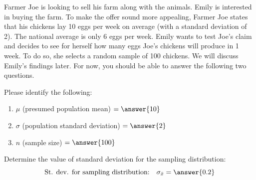 \documentclass{ximera}
\begin{document}
\begin{problem}\label{pr:farmerJoe}
Farmer Joe is looking to sell his farm along with the animals. Emily is interested in buying the farm. To make the offer sound more appealing, Farmer Joe states that his chickens lay 10 eggs per week on average (with a standard deviation of 2).  The national average is only 6 eggs per week. Emily wants to test Joe's claim and decides to see for herself how many eggs Joe's chickens will produce in 1 week. To do so, she selects a random sample of 100 chickens. We will discuss Emily's findings later.  For now, you should be able to answer the following two questions.

\begin{question}
Please identify the following:
 \begin{enumerate}
     \item $\mu$ (presumed population mean) $= \answer{10}$
     \item $\sigma$ (population standard deviation) $= \answer{2}$
     \item $n$ (sample size) $= \answer{100}$
\end{enumerate}
\end{question}

\begin{question}
Determine the value of standard deviation for the sampling distribution:
$$\mbox{St. dev. for sampling distribution:}\quad\sigma_{\bar{x}}= \answer{0.2}$$
\end{question}



\end{problem}
\end{document}
